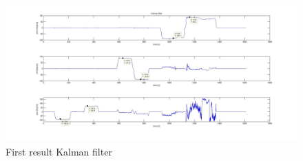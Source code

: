 \begin{figure}[H]
	\centering\includegraphics[width=1.0\textwidth]{fig/Res_Kal_Comp/initial_Kalman}
	\caption{First result Kalman filter}
	\label{fig:initial_Kalman}
\end{figure}

